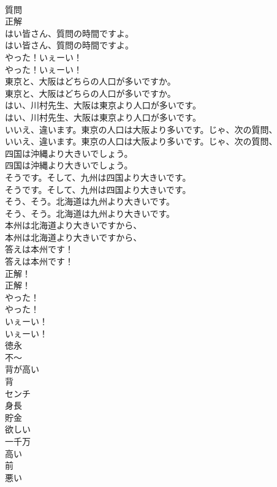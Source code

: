 \documentclass[8pt]{extreport}
\begin{document}
\begin{CJK}{UTF8}{min}
\\	質問
\\	正解
\\	はい皆さん、質問の時間ですよ。	
\\	はい皆さん、質問の時間ですよ。 
\\	やった！いぇーい！	
\\	やった！いぇーい！ 
\\	東京と、大阪はどちらの人口が多いですか。	
\\	東京と、大阪はどちらの人口が多いですか。 
\\	はい、川村先生、大阪は東京より人口が多いです。	
\\	はい、川村先生、大阪は東京より人口が多いです。 
\\	いいえ、違います。東京の人口は大阪より多いです。じゃ、次の質問、	
\\	いいえ、違います。東京の人口は大阪より多いです。じゃ、次の質問、 
\\	四国は沖縄より大きいでしょう。	
\\	四国は沖縄より大きいでしょう。 
\\	そうです。そして、九州は四国より大きいです。	
\\	そうです。そして、九州は四国より大きいです。 
\\	そう、そう。北海道は九州より大きいです。	
\\	そう、そう。北海道は九州より大きいです。 
\\	本州は北海道より大きいですから、	
\\	本州は北海道より大きいですから、 
\\	答えは本州です！	
\\	答えは本州です！ 
\\	正解！	
\\	正解！ 
\\	やった！	
\\	やった！ 
\\	いぇーい！	
\\	いぇーい！ 
\\	徳永
\\	不～
\\	背が高い
\\	背
\\	センチ
\\	身長
\\	貯金
\\	欲しい
\\	一千万
\\	高い
\\	前
\\	悪い

\end{CJK}
\end{document}
